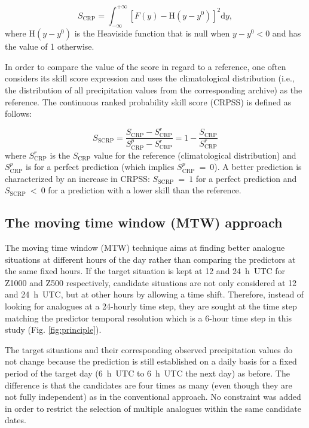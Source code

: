\documentclass[hess, manuscript]{copernicus}
\begin{document}
	\begin{equation}
	\label{eq:CRPS}
	S_{\text{CRP}} = \int_{-\infty}^{+\infty} \left[ F(y)-\text{H}(y-y^{0})\right]^{2} \text{d}y ,  
	\end{equation}
	where $\text{H}(y-y^{0})$ is the Heaviside function that is null when $y-y^{0}<0$ and has the value of 1 otherwise.
	
	In order to compare the value of the score in regard to a reference, one often considers its skill score expression and uses the climatological distribution (i.e., the distribution of all precipitation values from the corresponding archive) as the reference. The continuous ranked probability skill score (CRPSS) is defined as follows:
	
	\begin{equation}
	\label{eq:CRPSS}
	S_{\text{SCRP}} = \frac{S_{\text{CRP}}-S_{\text{CRP}}^{r}}{S_{\text{CRP}}^{p}-S_{\text{CRP}}^{r}} = 1-\frac{S_{\text{CRP}}}{S_{\text{CRP}}^{r}}
	\end{equation}
	where $S_{\text{CRP}}^{r}$ is the $S_{\text{CRP}}$ value for the reference (climatological distribution) and $S_{\text{CRP}}^{p}$ is for a perfect prediction (which implies $S_{\text{CRP}}^{p}~=~0$). A better prediction is characterized by an increase in CRPSS: $S_{\text{SCRP}}~=~1$ for a perfect prediction and $S_{\text{SCRP}}~<~0$ for a prediction with a lower skill than the reference.
	
	
	\subsection{The moving time window (MTW) approach}
	\label{sec:mtw}
	
	The moving time window (MTW) technique aims at finding better analogue situations at different hours of the day rather than comparing the predictors at the same fixed hours. If the target situation is kept at 12 and 24~h~UTC for Z1000 and Z500 respectively, candidate situations are not only considered at 12 and 24~h~UTC, but at other hours by allowing a time shift. Therefore, instead of looking for analogues at a 24-hourly time step, they are sought at the time step matching the predictor temporal resolution which is a 6-hour time step in this study (Fig. \ref{fig:principle}).
	
	The target situations and their corresponding observed precipitation values do not change because the prediction is still established on a daily basis for a fixed period of the target day (6~h~UTC to 6~h~UTC the next day) as before. The difference is that the candidates are four times as many (even though they are not fully independent) as in the conventional approach. No constraint was added in order to restrict the selection of multiple analogues within the same candidate dates.
	
\end{document}
